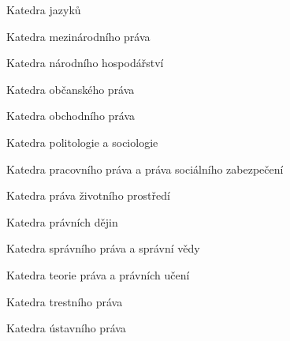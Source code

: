 \vfill\eject

\sec Katedra jazyků








\vfill\eject

\sec Katedra mezinárodního práva



\vfill\eject

\sec Katedra národního hospodářství



\vfill\eject

\sec Katedra občanského práva





\vfill\eject

\sec Katedra obchodního práva




\vfill\eject

\sec Katedra politologie a sociologie




\vfill\eject

\sec Katedra pracovního práva a práva sociálního zabezpečení




\vfill\eject

\sec Katedra práva životního prostředí



\vfill\eject

\sec Katedra právních dějin





\vfill\eject

\sec Katedra správního práva a správní vědy



\vfill\eject

\sec Katedra teorie práva a právních učení




\vfill\eject

\sec Katedra trestního práva



\vfill\eject

\sec Katedra ústavního práva





\bye
